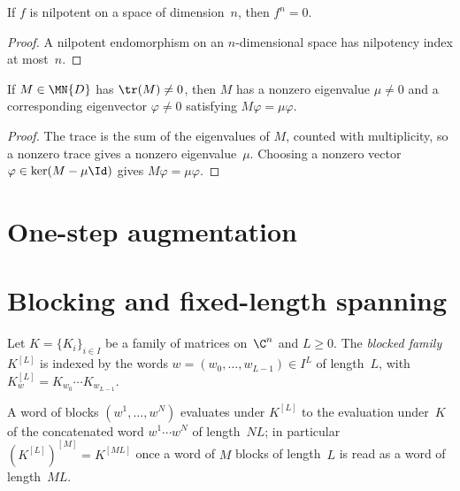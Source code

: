 \begin{theorem}\label{thm:nilpotent_pow_bound}
    \leanok
    If $f$ is nilpotent on a space of dimension~$n$, then $f^n=0$.
\end{theorem}

\begin{proof}\leanok
    A nilpotent endomorphism on an $n$-dimensional space has
    nilpotency index at most~$n$.
\end{proof}

\begin{theorem}\label{thm:eigenvector_from_trace}
    \leanok
    If $M\in\MN{D}$ has $\tr(M)\neq0$, then $M$ has a nonzero eigenvalue
    $\mu\neq0$ and a corresponding eigenvector $\varphi\neq0$ satisfying
    $M\varphi=\mu\varphi$.
\end{theorem}

\begin{proof}
    \leanok
    The trace is the sum of the eigenvalues of $M$, counted with
    multiplicity, so a nonzero trace gives a nonzero eigenvalue~$\mu$.
    Choosing a nonzero vector $\varphi\in\ker(M-\mu\Id)$ gives
    $M\varphi=\mu\varphi$.
\end{proof}

\section{One-step augmentation}
\label{sec:app_wielandt_augmentation}

\section{Blocking and fixed-length spanning}
\label{sec:app_wielandt_blocking_support}
\label{sec:rectangular_span}

\begin{definition}
    \label{def:kraus_block}
    \leanok
    Let $K=\{K_i\}_{i\in I}$ be a family of matrices on~$\C^n$ and $L\geq0$.
    The \emph{blocked family} $K^{[L]}$ is indexed by the words
    $w=(w_0,\ldots,w_{L-1})\in I^L$ of length~$L$, with
    $K^{[L]}_w=K_{w_0}\cdots K_{w_{L-1}}$.
\end{definition}

\begin{theorem}
    \label{thm:kraus_block_eval_word}
    \leanok
    A word of blocks $(w^1,\ldots,w^N)$ evaluates under $K^{[L]}$ to the
    evaluation under~$K$ of the concatenated word $w^1\cdots w^N$ of
    length~$NL$; in particular $(K^{[L]})^{[M]}=K^{[ML]}$ once a word of
    $M$ blocks of length~$L$ is read as a word of length~$ML$.
\end{theorem}

